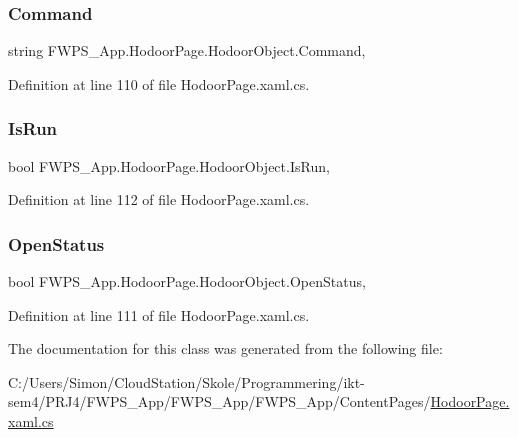 \subsubsection{\texorpdfstring{Command}{Command}}
{\footnotesize\ttfamily string F\+W\+P\+S\+\_\+\+App.\+Hodoor\+Page.\+Hodoor\+Object.\+Command\hspace{0.3cm}{\ttfamily [get]}, {\ttfamily [set]}}



Definition at line 110 of file Hodoor\+Page.\+xaml.\+cs.

\mbox{\label{class_f_w_p_s___app_1_1_hodoor_page_1_1_hodoor_object_a5fc47b9df18d98bcb81dba8b3047a9ad}} 
\subsubsection{\texorpdfstring{Is\+Run}{IsRun}}
{\footnotesize\ttfamily bool F\+W\+P\+S\+\_\+\+App.\+Hodoor\+Page.\+Hodoor\+Object.\+Is\+Run\hspace{0.3cm}{\ttfamily [get]}, {\ttfamily [set]}}



Definition at line 112 of file Hodoor\+Page.\+xaml.\+cs.

\mbox{\label{class_f_w_p_s___app_1_1_hodoor_page_1_1_hodoor_object_ac88da15b7efefcf3a5d32752df1d4d6f}} 
\subsubsection{\texorpdfstring{Open\+Status}{OpenStatus}}
{\footnotesize\ttfamily bool F\+W\+P\+S\+\_\+\+App.\+Hodoor\+Page.\+Hodoor\+Object.\+Open\+Status\hspace{0.3cm}{\ttfamily [get]}, {\ttfamily [set]}}



Definition at line 111 of file Hodoor\+Page.\+xaml.\+cs.



The documentation for this class was generated from the following file\+:\begin{DoxyCompactItemize}
\item 
C\+:/\+Users/\+Simon/\+Cloud\+Station/\+Skole/\+Programmering/ikt-\/sem4/\+P\+R\+J4/\+F\+W\+P\+S\+\_\+\+App/\+F\+W\+P\+S\+\_\+\+App/\+F\+W\+P\+S\+\_\+\+App/\+Content\+Pages/\mbox{\hyperlink{_hodoor_page_8xaml_8cs}{Hodoor\+Page.\+xaml.\+cs}}\end{DoxyCompactItemize}
